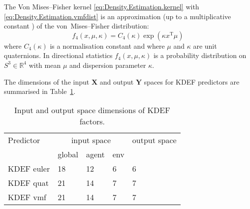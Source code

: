 The Von Mises--Fisher kernel \eqref{eq:Density.Estimation.kernel} with \eqref{eq:Density.Estimation.vmfdist} is an approximation (up to a multiplicative constant \cite{detry_learning_2010}) of the von~Mises--Fisher distribution:
\begin{equation}
f_4(x, \mu, \kappa) = C_4(\kappa)\exp(\kappa x^\mathrm{T} \mu)
\label{eq:Density.Estimation.vmf}
\end{equation}
\noindent where $C_4(\kappa)$ is a normalisation constant and where $\mu$ and $\kappa$ are unit quaternions. In directional statistics $f_4(x,\mu,\kappa)$ is a probability distribution on $S^3 \in \mathbb{R}^4$ with mean $\mu$ and dispersion parameter $\kappa$.

The dimensions of the input $\mathbf{X}$ and output $\mathbf{Y}$ spaces for KDEF predictors are summarised in Table~\ref{tab:InpOutSpaceKDE}.

\begin{table}[b]
\begin{center}
\begin{tabular}{|l|l|l|l|l|}
\cline{1-5}
Predictor & \multicolumn{3}{|c|}{input space} & output space \\
\cline{2-4}
 & global & agent & env & \\
\cline{1-5}
KDEF euler & 18 & 12 & 6 & 6 \\
KDEF quat & 21 & 14 & 7 & 7 \\
KDEF vmf & 21 & 14 & 7 & 7 \\
\cline{1-5}
\end{tabular}
\end{center}
\caption[Input/output space KDEF]{Input and output space dimensions of KDEF factors.}\label{tab:InpOutSpaceKDE}
\end{table}

